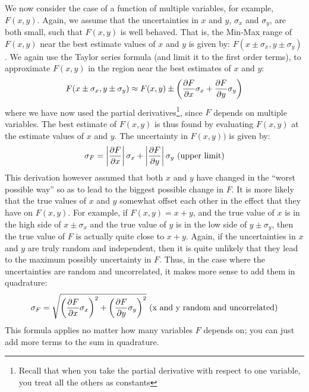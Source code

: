 We now consider the case of a function of multiple variables, for example, $F(x,y)$. Again, we assume that the uncertainties in $x$ and $y$, $\sigma_{x}$ and $\sigma_{y}$, are both small, such that $F(x,y)$ is well behaved. That is, the Min-Max range of $F(x,y)$ near the best estimate values of $x$ and $y$ is given by: $F(x\pm\sigma_{x}, y\pm\sigma_{y})$. We again use the Taylor series formula (and limit it to the first order terms), to approximate $F(x,y)$ in the region near the best estimates of $x$ and $y$:
\begin{align}
F(x\pm\sigma_{x}, y\pm\sigma_{y})\approx F(x,y)\pm \left(\frac{\partial F}{\partial x}\sigma_{x} + \frac{\partial F}{\partial y} \sigma_{y}\right)
\end{align}
where we have now used the partial derivatives\footnote{Recall that when you take the partial derivative with respect to one variable, you treat all the others as constants}, since $F$ depends on multiple variables. The best estimate of $F(x,y)$ is thus found by evaluating $F(x,y)$ at the estimate values of $x$ and $y$. The uncertainty in $F(x,y))$ is given by:
\begin{align}
\label{eqn:maxDerivError}
\sigma_{F} =\left| \frac{\partial F}{\partial x} \right| \sigma_{x} +  \left| \frac{\partial F}{\partial y} \right| \sigma_{y} \text{      (upper limit)}
\end{align}
This derivation however assumed that both $x$ and $y$ have changed in the ``worst possible way'' so as to lead to the biggest possible change in $F$. It is more likely that the true values of $x$ and $y$ somewhat offset each other in the effect that they have on $F(x,y)$. For example, if $F(x,y)=x+y$, and the true value of $x$ is in the high side of $x\pm \sigma_{x}$ and the true value of $y$ is in the low side of $y \pm \sigma_{y}$, then the true value of $F$ is actually quite close to $x+y$. Again, if the uncertainties in $x$ and $y$ are truly random and independent, then it is quite unlikely that they lead to the maximum possibly uncertainty in $F$. Thus, in the case where the uncertainties are random and uncorrelated, it makes more sense to add them in quadrature:
\begin{align}
\label{eqn:derivPropagate}
\sigma_{F} = \sqrt{\left(\frac{\partial F}{\partial x}\sigma_{x}\right)^2 + \left(\frac{\partial F}{\partial y} \sigma_{y}\right)^2}\text{      (x and y random and uncorrelated)}
\end{align}
This formula applies no matter how many variables $F$ depends on; you can just add more terms to the sum in quadrature. 

